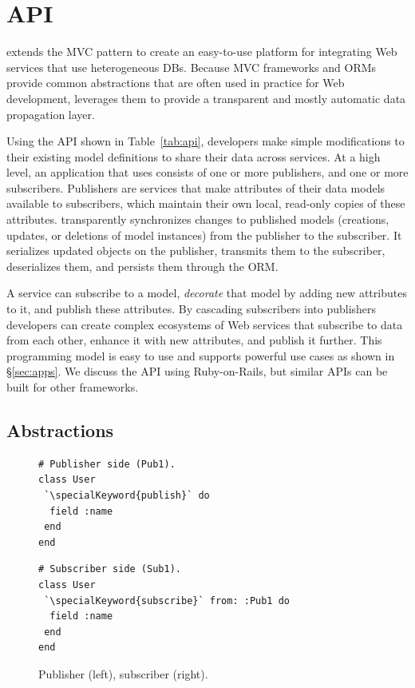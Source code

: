 \section{\synapse API}
\label{sec:programming-model}

\synapse extends the MVC pattern to create an
easy-to-use platform for integrating Web services that use
heterogeneous DBs.  
Because MVC frameworks and ORMs provide common abstractions that are
often used in practice for Web development, \synapse
leverages them to provide a transparent and mostly automatic data
propagation layer.

Using the \synapse API shown in Table~\ref{tab:api}, developers make
simple modifications to their existing model definitions to share their data
across services. At a high
level, an application that uses \synapse consists of one or more publishers,
and one or more subscribers. Publishers are services that make attributes of
their data models available to subscribers, which maintain their own local,
read-only copies of these attributes. \synapse transparently
synchronizes changes to published models (creations, updates, or deletions of
model instances) from the publisher to the subscriber.  It serializes
updated objects on the publisher, transmits them to the subscriber, deserializes
them, and persists them through the ORM.

A service can
subscribe to a model, \emph{decorate} that model by adding new
attributes to it, and publish these attributes. By cascading
subscribers into publishers developers can create complex
ecosystems of Web services that subscribe to data from each other, enhance it
with new attributes, and publish it further.  This
programming model is easy to use and supports powerful use
cases as shown in \S\ref{sec:apps}.
We discuss the \synapse API using Ruby-on-Rails, but similar APIs can be
built for other frameworks.


\subsection{\synapse Abstractions}
\label{sec:api}

\begin{figure}
\centering
\begin{minipage}{.8\textwidth}
\begin{minipage}{.4\textwidth}
\begin{lstlisting}[framexleftmargin=5pt]
# Publisher side (Pub1).
class User
 `\specialKeyword{publish}` do
  field :name
 end
end
\end{lstlisting}
\end{minipage}
\hspace{1.2in}
\begin{minipage}{.4\textwidth}
\begin{lstlisting}[framexleftmargin=5pt]
# Subscriber side (Sub1).
class User
 `\specialKeyword{subscribe}` from: :Pub1 do
  field :name
 end
end
\end{lstlisting}
\end{minipage}
\end{minipage}
\caption{{Publisher (left), subscriber (right).}}
\label{fig:pub-sub}
\end{figure}

